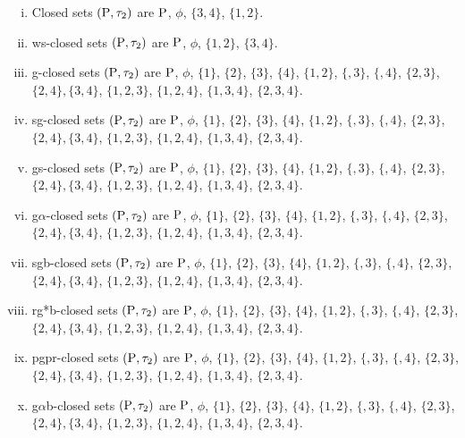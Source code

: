 \begin{exm}
\begin{enumerate}[(i)]
\item Closed sets $(\mathrm{P}, \tau_{2})$ are $\mathrm{P}$, $\phi$, $\{3, 4\}$, $\{1, 2\}$.

\item ws-closed sets $(\mathrm{P}, \tau_{2})$ are $\mathrm{P}$, $\phi$, $\{1, 2\}$, $\{3, 4\}$.

\item g-closed sets $(\mathrm{P}, \tau_{2})$ are $\mathrm{P}$, $\phi$, $\{1\}$, $\{2\}$, $\{3\}$, $\{4\}$, $\{1, 2\}$, $\{, 3\}$, $\{, 4\}$, $\{2, 3\}$, $\{2, 4\}, \{3, 4\}$, $\{1, 2, 3\}$, $\{1, 2, 4\}$, $\{1, 3, 4\}$, $\{2, 3, 4\}$.

\item sg-closed sets $(\mathrm{P}, \tau_{2})$ are $\mathrm{P}$, $\phi$, $\{1\}$, $\{2\}$, $\{3\}$, $\{4\}$, $\{1, 2\}$, $\{, 3\}$, $\{, 4\}$, $\{2, 3\}$, $\{2, 4\}, \{3, 4\}$, $\{1, 2, 3\}$, $\{1, 2, 4\}$, $\{1, 3, 4\}$, $\{2, 3, 4\}$.

\item gs-closed sets $(\mathrm{P}, \tau_{2})$ are $\mathrm{P}$, $\phi$, $\{1\}$, $\{2\}$, $\{3\}$, $\{4\}$, $\{1, 2\}$, $\{, 3\}$, $\{, 4\}$, $\{2, 3\}$, $\{2, 4\}, \{3, 4\}$, $\{1, 2, 3\}$, $\{1, 2, 4\}$, $\{1, 3, 4\}$, $\{2, 3, 4\}$.

\item g$\alpha$-closed sets $(\mathrm{P}, \tau_{2})$ are $\mathrm{P}$, $\phi$, $\{1\}$, $\{2\}$, $\{3\}$, $\{4\}$, $\{1, 2\}$, $\{, 3\}$, $\{, 4\}$, $\{2, 3\}$, $\{2, 4\}, \{3, 4\}$, $\{1, 2, 3\}$, $\{1, 2, 4\}$, $\{1, 3, 4\}$, $\{2, 3, 4\}$.

\item sgb-closed sets $(\mathrm{P}, \tau_{2})$ are $\mathrm{P}$, $\phi$, $\{1\}$, $\{2\}$, $\{3\}$, $\{4\}$, $\{1, 2\}$, $\{, 3\}$, $\{, 4\}$, $\{2, 3\}$, $\{2, 4\}, \{3, 4\}$, $\{1, 2, 3\}$, $\{1, 2, 4\}$, $\{1, 3, 4\}$, $\{2, 3, 4\}$.

\item rg*b-closed sets $(\mathrm{P}, \tau_{2})$ are $\mathrm{P}$, $\phi$, $\{1\}$, $\{2\}$, $\{3\}$, $\{4\}$, $\{1, 2\}$, $\{, 3\}$, $\{, 4\}$, $\{2, 3\}$, $\{2, 4\}, \{3, 4\}$, $\{1, 2, 3\}$, $\{1, 2, 4\}$, $\{1, 3, 4\}$, $\{2, 3, 4\}$.

\item pgpr-closed sets $(\mathrm{P}, \tau_{2})$ are $\mathrm{P}$, $\phi$, $\{1\}$, $\{2\}$, $\{3\}$, $\{4\}$, $\{1, 2\}$, $\{, 3\}$, $\{, 4\}$, $\{2, 3\}$, $\{2, 4\}, \{3, 4\}$, $\{1, 2, 3\}$, $\{1, 2, 4\}$, $\{1, 3, 4\}$, $\{2, 3, 4\}$.

\item g$\alpha$b-closed sets $(\mathrm{P}, \tau_{2})$ are $\mathrm{P}$, $\phi$, $\{1\}$, $\{2\}$, $\{3\}$, $\{4\}$, $\{1, 2\}$, $\{, 3\}$, $\{, 4\}$, $\{2, 3\}$, $\{2, 4\}, \{3, 4\}$, $\{1, 2, 3\}$, $\{1, 2, 4\}$, $\{1, 3, 4\}$, $\{2, 3, 4\}$.


\end{enumerate}
\end{exm}
